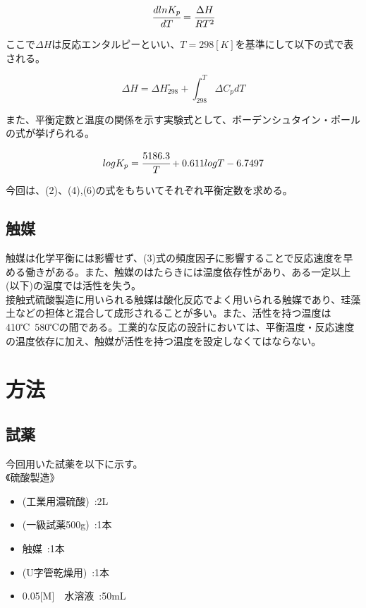 \documentclass{ltjsarticle}
\begin{document}
\begin{equation}
    \cfrac{dlnK_p}{dT}=\cfrac{\Delta H}{RT^2}
\end{equation}

ここで$\Delta H$は反応エンタルピーといい、$T=298[K]$を基準にして以下の式で表される。

\begin{equation}
    \Delta H = \Delta H_{298}^{\circ} + \int_{298}^T \Delta C_p dT
\end{equation}

また、平衡定数と温度の関係を示す実験式として、ボーデンシュタイン・ポールの式が挙げられる。

\begin{equation}
    logK_p=\cfrac{5186.3}{T} +0.611logT -6.7497
\end{equation}

今回は、(2)、(4),(6)の式をもちいてそれぞれ平衡定数を求める。

\subsection{触媒}

触媒は化学平衡には影響せず、(3)式の頻度因子に影響することで反応速度を早める働きがある。また、触媒のはたらきには温度依存性があり、ある一定以上(以下)の温度では活性を失う。\\
接触式硫酸製造に用いられる触媒は酸化反応でよく用いられる触媒であり、珪藻土などの担体と混合して成形されることが多い。また、活性を持つ温度は410℃~580℃の間である。工業的な反応の設計においては、平衡温度・反応速度の温度依存に加え、触媒が活性を持つ温度を設定しなくてはならない。

\section{方法}

\subsection{試薬}

今回用いた試薬を以下に示す。\\
《硫酸製造》

\begin{itemize}
    \item {}(工業用濃硫酸)\ :2L
    \item (一級試薬500g)\ :1本
    \item {}触媒\ :1本
    \item {}(U字管乾燥用)\ :1本
    \item 0.05[M]　水溶液\ :50mL
\end{itemize}
\end{document}
